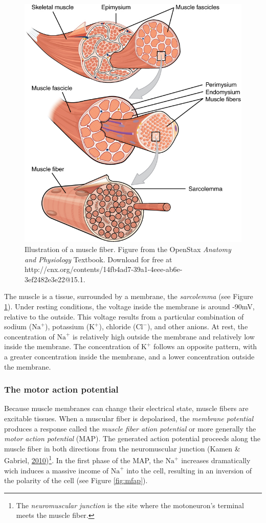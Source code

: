 \documentclass[a4paper,12pt,twoside,openright,oldfontcommands]{memoir}
\let\rmarkdownfootnote\footnote%
\def\footnote{\protect\rmarkdownfootnote}
\begin{document}
\begin{figure}[H]

{\centering \includegraphics[width=0.5\linewidth]{assets/muscle} 

}

\caption{Illustration of a muscle fiber. Figure from the OpenStax \textit{Anatomy and Physiology} Textbook. Download for free at http://cnx.org/contents/14fb4ad7-39a1-4eee-ab6e-3ef2482e3e22@15.1.}\label{fig:muscle}
\end{figure}

The muscle is a tissue, surrounded by a membrane, the \emph{sarcolemma}
(see Figure \ref{fig:muscle}). Under resting conditions, the voltage
inside the membrane is around -90mV, relative to the outside. This
voltage results from a particular combination of sodium
(\(\text{Na}^{+}\)), potassium (\(\text{K}^{+}\)), chloride
(\(\text{Cl}^{-}\)), and other anions. At rest, the concentration of
\(\text{Na}^{+}\) is relatively high outside the membrane and relatively
low inside the membrane. The concentration of \(\text{K}^{+}\) follows
an opposite pattern, with a greater concentration inside the membrane,
and a lower concentration outside the membrane.

\subsubsection{The motor action
potential}\label{the-motor-action-potential}

Because muscle membranes can change their electrical state, muscle
fibers are excitable tissues. When a muscular fiber is depolarised, the
\emph{membrane potential} produces a response called the \emph{muscle
fiber ation potential} or more generally the \emph{motor action
potential} (MAP). The generated action potential proceeds along the
muscle fiber in both directions from the neuromuscular junction (Kamen
\& Gabriel,
\protect\hyperlink{ref-kamen_essentials_2010}{2010})\footnote{The
  \emph{neuromuscular junction} is the site where the motoneuron's
  terminal meets the muscle fiber.}. In the first phase of the MAP, the
\(\text{Na}^{+}\) increases dramatically wich induces a massive income
of \(\text{Na}^{+}\) into the cell, resulting in an inversion of the
polarity of the cell (see Figure \ref{fig:mfap}).
\end{document}

